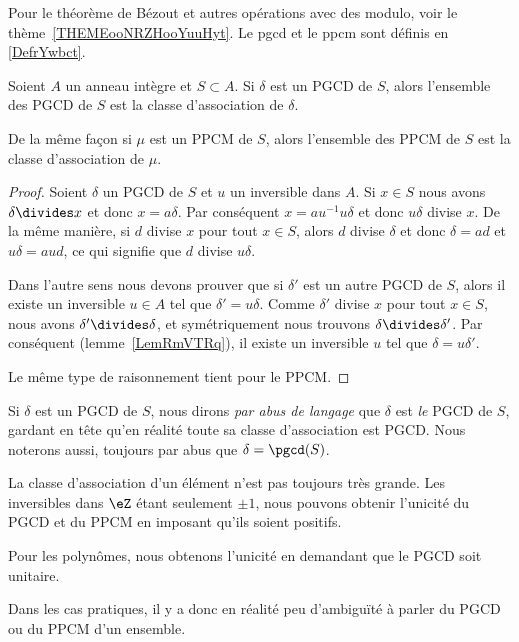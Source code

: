 Pour le théorème de Bézout et autres opérations avec des modulo, voir le thème~\ref{THEMEooNRZHooYuuHyt}. Le pgcd et le ppcm sont définis en \ref{DefrYwbct}.

\begin{lemma}
	Soient \( A\) un anneau intègre et \( S\subset A\). Si \( \delta\) est un PGCD de \( S\), alors l'ensemble des PGCD de \( S\) est la classe d'association de \( \delta\).

	De la même façon si \( \mu\) est un PPCM de \( S\), alors l'ensemble des PPCM de \( S\) est la classe d'association de \( \mu\).
\end{lemma}

\begin{proof}
	Soient \( \delta\) un PGCD de \( S\) et \( u\) un inversible dans \( A\). Si \( x\in S\) nous avons \( \delta\divides x\) et donc \( x=a\delta\). Par conséquent \( x=au^{-1}u\delta\) et donc \( u\delta\) divise \( x\). De la même manière, si \( d\) divise \( x\) pour tout \( x\in S\), alors \( d\) divise \( \delta\) et donc \( \delta=ad\) et \( u\delta=aud\), ce qui signifie que \( d\) divise \( u\delta\).

	Dans l'autre sens nous devons prouver que si \( \delta'\) est un autre PGCD de \( S\), alors il existe un inversible \( u\in A\) tel que \( \delta'=u\delta\). Comme \( \delta'\) divise \( x\) pour tout \( x\in S\), nous avons \( \delta'\divides \delta\), et symétriquement nous trouvons \( \delta\divides\delta'\). Par conséquent (lemme~\ref{LemRmVTRq}), il existe un inversible \( u\) tel que \( \delta=u\delta'\).

	Le même type de raisonnement tient pour le PPCM.
\end{proof}

Si \( \delta\) est un PGCD de \( S\), nous dirons \emph{par abus de langage} que \( \delta\) est \emph{le} PGCD de \( S\), gardant en tête qu'en réalité toute sa classe d'association est PGCD. Nous noterons aussi, toujours par abus que \( \delta=\pgcd(S)\).

\begin{remark}
	La classe d'association d'un élément n'est pas toujours très grande. Les inversibles dans \( \eZ\) étant seulement \( \pm 1\), nous pouvons obtenir l'unicité du PGCD et du PPCM en imposant qu'ils soient positifs.

	Pour les polynômes, nous obtenons l'unicité en demandant que le PGCD soit unitaire.

	Dans les cas pratiques, il y a donc en réalité peu d'ambiguïté à parler du PGCD ou du PPCM d'un ensemble.
\end{remark}

